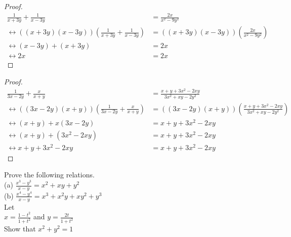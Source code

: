 \documentclass[6pt]{article}
\begin{document}
\begin{proof}
\begin{align*}
\frac{1}{x + 3y} + \frac{1}{x - 3y} &= \frac{2x}{x^2 - 9y^2} && \\
\leftrightarrow \left((x + 3y)(x - 3y)\right)\left(\frac{1}{x + 3y} + \frac{1}{x - 3y}\right)
    &= \left((x + 3y)(x - 3y)\right)\left(\frac{2x}{x^2 - 9y^2}\right) && \\
\leftrightarrow (x - 3y) + (x + 3y) &= 2x && \\
\leftrightarrow 2x &= 2x 
\end{align*}
\end{proof}
\begin{proof}
\begin{align*}
\frac{1}{3x - 2y} + \frac{x}{x + y} &= \frac{x + y + 3x^2 - 2xy}{3x^2 + xy - 2y^2} && \\
\leftrightarrow \left((3x - 2y)(x + y)\right)\left(\frac{1}{3x - 2y} + \frac{x}{x + y}\right)
    &= \left((3x - 2y)(x + y)\right)\left(\frac{x + y + 3x^2 - 2xy}{3x^2 + xy - 2y^2}\right) && \\
\leftrightarrow (x + y) + x(3x-2y) &= x + y + 3x^2 - 2xy && \\
\leftrightarrow (x + y) + (3x^2 - 2xy) &= x + y + 3x^2 - 2xy && \\
\leftrightarrow x + y + 3x^2 - 2xy &= x + y + 3x^2 - 2xy
\end{align*}
\end{proof}


\begin{tcolorbox}[title=Problem 4, breakable]
Prove the following relations. \\
(a) $\frac{x^3 - y^3}{x - y} = x^2 + xy + y^2$ \\
(b) $\frac{x^4 - y^4}{x - y} = x^3 + x^2y + xy^2 + y^3$ \\
Let \\
$x = \frac{1 - t^2}{1 + t^2}$ and $y = \frac{2t}{1 + t^2}$ \\
Show that $x^2 + y^2 = 1$
\end{tcolorbox}
\end{document}

